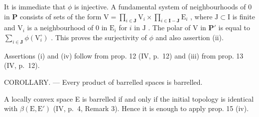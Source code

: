 It is immediate that \(\phi\) is injective. A fundamental system of neighbourhoods of 0 in \(\mathbf{P}\) consists of sets of the form \(\mathrm{V} = \prod_{i\in \mathbf{J}}\mathrm{V}_i\times \prod_{i\in \mathbf{I} - \mathbf{J}}\mathrm{E}_i\) , where \(\mathrm{J}\subset \mathrm{I}\) is finite and \(\mathrm{V}_i\) is a neighbourhood of 0 in \(\mathrm{E}_i\) for \(i\) in \(\mathrm{J}\) . The polar of \(\mathrm{V}\) in \(\mathbf{P}'\) is equal to \(\sum_{i\in \mathbf{J}}\phi (\mathrm{V}_i^\circ)\) . This proves the surjectivity of \(\phi\) and also assertion (ii).

Assertions (i) and (iv) follow from prop. 12 (IV, p.~12) and (iii) from prop. 13 (IV, p.~12).

COROLLARY. --- Every product of barrelled spaces is barrelled.

A locally convex space E is barrelled if and only if the initial topology is identical with \(\beta(\mathrm{E}, \mathrm{E}')\) (IV, p.~4, Remark 3). Hence it is enough to apply prop. 15 (iv).

